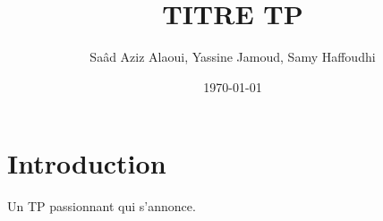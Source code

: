 \documentclass[12pt,a4paper,titlepage]{article}
\title{TITRE TP}
\author{Saâd Aziz Alaoui, Yassine Jamoud, Samy Haffoudhi}
\date{\today}
\begin{document}
\maketitle

\section*{Introduction}

Un TP passionnant qui s'annonce.
\end{document}
